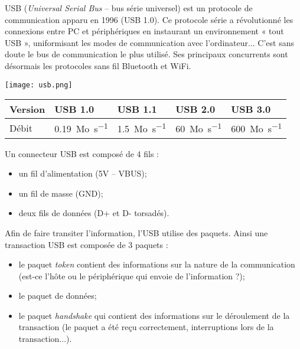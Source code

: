 \noindent \begin{minipage}[c]{.75\linewidth}
USB (\textit{Universal Serial Bus} -- bus série universel) est un protocole de communication apparu en 1996 (USB 1.0). Ce protocole série a révolutionné les connexions entre PC et périphériques en instaurant un environnement « tout USB », uniformisant les modes de communication avec l'ordinateur... C'est sans doute le bus de communication le plus utilisé. Ses principaux concurrents sont désormais les protocoles sans fil Bluetooth et WiFi.
\end{minipage}\hfill
\begin{minipage}[c]{.2\linewidth}
\begin{center}
\texttt{[image: usb.png]}
\end{center}
\end{minipage}

\begin{center}
\begin{tabular}{|l|l|l|l|l|}
\hline
Version & USB 1.0 & USB 1.1 & USB 2.0 & USB 3.0 \\ \hline
Débit   & \SI{0,19}{Mo.s^{-1}} & \SI{1,5}{Mo.s^{-1}} & \SI{60}{Mo.s^{-1}} & \SI{600}{Mo.s^{-1}}  \\ \hline
\end{tabular}
\end{center}

Un connecteur USB est composé de 4 fils : 
\begin{itemize}
\item un fil d'alimentation (5V -- VBUS);
\item un fil de masse (GND);
\item deux fils de données (D+ et D- torsadés). 
\end{itemize}

Afin de faire transiter l'information, l'USB utilise des paquets. Ainsi une transaction USB est composée de 3 paquets :
\begin{itemize}
\item le paquet \textit{token} contient des informations sur la nature de la communication (est-ce l'hôte ou le périphérique qui envoie de l'information ?);
\item le paquet de données;
\item le paquet \textit{handshake} qui contient des informations sur le déroulement de la transaction (le paquet a été reçu correctement, interruptions lors de la transaction...).
\end{itemize}


